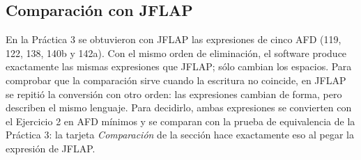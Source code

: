 
\hypertarget{comparaciuxf3n-con-jflap}{%
\subsection{Comparación con JFLAP}\label{comparaciuxf3n-con-jflap}}

En la Práctica 3 se obtuvieron con JFLAP las expresiones de cinco AFD (119, 122, 138, 140b y 142a). Con el mismo orden de eliminación, el software produce exactamente las mismas expresiones que JFLAP; sólo cambian los espacios. Para comprobar que la comparación sirve cuando la escritura no coincide, en JFLAP se repitió la conversión con otro orden: las expresiones cambian de forma, pero describen el mismo lenguaje. Para decidirlo, ambas expresiones se convierten con el Ejercicio 2 en AFD mínimos y se comparan con la prueba de equivalencia de la Práctica 3: la tarjeta \emph{Comparación} de la sección hace exactamente eso al pegar la expresión de JFLAP.

